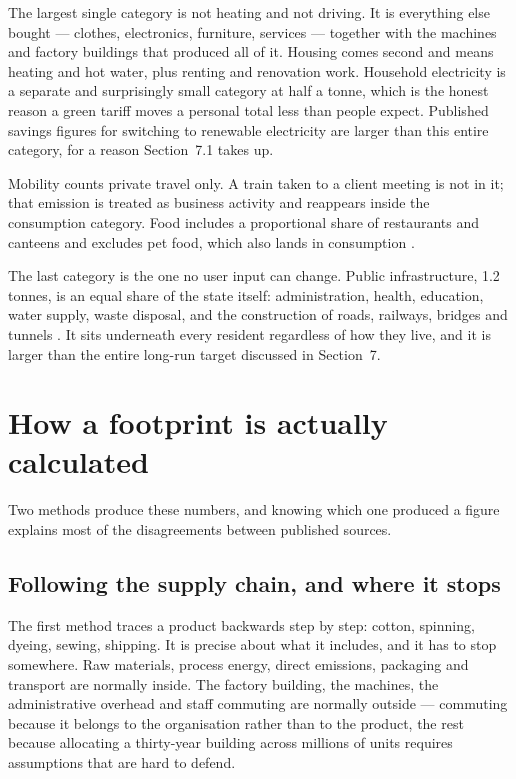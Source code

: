 \documentclass[11pt,a4paper]{article}
\begin{document}
The largest single category is not heating and not driving. It is everything else
bought — clothes, electronics, furniture, services — together with the machines and
factory buildings that produced all of it. Housing comes second and means heating
and hot water, plus renting and renovation work. Household electricity is a
separate and surprisingly small category at half a tonne, which is the honest
reason a green tariff moves a personal total less than people expect. Published
savings figures for switching to renewable electricity are larger than this entire
category, for a reason Section~7.1 takes up.

Mobility counts private travel only. A train taken to a client meeting is not in
it; that emission is treated as business activity and reappears inside the
consumption category. Food includes a proportional share of restaurants and
canteens and excludes pet food, which also lands in consumption \cite{uba-rechner}.

The last category is the one no user input can change. Public infrastructure, 1.2
tonnes, is an equal share of the state itself: administration, health, education,
water supply, waste disposal, and the construction of roads, railways, bridges and
tunnels \cite{uba-rechner}. It sits underneath every resident regardless of how
they live, and it is larger than the entire long-run target discussed in
Section~7.

\section{How a footprint is actually calculated}

Two methods produce these numbers, and knowing which one produced a figure explains
most of the disagreements between published sources.

\subsection{Following the supply chain, and where it stops}

The first method traces a product backwards step by step: cotton, spinning, dyeing,
sewing, shipping. It is precise about what it includes, and it has to stop
somewhere. Raw materials, process energy, direct emissions, packaging and transport
are normally inside. The factory building, the machines, the administrative
overhead and staff commuting are normally outside — commuting because it belongs to
the organisation rather than to the product, the rest because allocating a
thirty-year building across millions of units requires assumptions that are hard to
defend.
\end{document}

